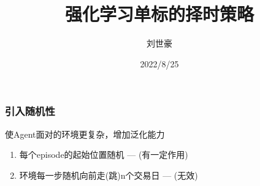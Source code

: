 \documentclass[aspectratio=169,9pt]{beamer}
\title{强化学习单标的择时策略}
\date[ISPN ’80]{2022/8/25}
\author[LiuShihao]{刘世豪}
\begin{document}
\begin{frame}[plain]            %
\titlepage
\end{frame}

\AtEndDocument
{
  \begin{frame}[plain]          %
  \end{frame}
}

\begin{frame}
  \frametitle{引入随机性}
  使Agent面对的环境更复杂，增加泛化能力
  \begin{enumerate}
  \item 每个episode的起始位置随机    --- (有一定作用)
  \item 环境每一步随机向前走(跳)n个交易日 --- (无效)
  \end{enumerate}
\end{frame}
\end{document}
